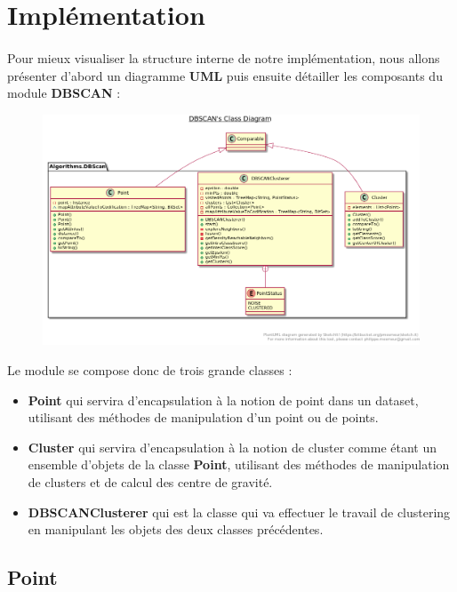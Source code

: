 		
		
	\section{Implémentation}
		\paragraph{}
		Pour mieux visualiser la structure interne de notre implémentation, nous allons présenter d'abord un diagramme \textbf{UML} puis ensuite détailler les composants du module \textbf{DBSCAN} : 
		\begin{figure}[H]
			\centering
			\includegraphics[width=\linewidth]{dbscan/images/uml.png}
		\end{figure}
		\par 
		Le module se compose donc de trois grande classes : 
		\begin{itemize}
			\item \textbf{Point} qui servira d'encapsulation à la notion de point dans un dataset, utilisant des méthodes de manipulation d'un point ou de points.
			\item \textbf{Cluster} qui servira d'encapsulation à la notion de cluster comme étant un ensemble d'objets de la classe \textbf{Point}, utilisant des méthodes de manipulation de clusters et de calcul des centre de gravité.
			\item \textbf{DBSCANClusterer} qui est la classe qui va effectuer le travail de clustering en manipulant les objets des deux classes précédentes.
		\end{itemize}
	
	\subsection{Point}
